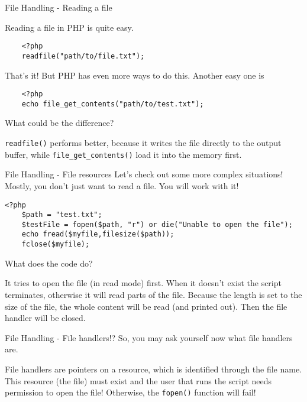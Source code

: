 \begin{frame}[fragile]{File Handling - Reading a file}
	
	Reading a file in PHP is quite easy. \pause
	\begin{lstlisting}
	<?php
	readfile("path/to/file.txt");
	\end{lstlisting} \pause
	That's it! But PHP has even more ways to do this. Another easy one is
	\begin{lstlisting}
	<?php
	echo file_get_contents("path/to/test.txt");
	\end{lstlisting} \pause
	
	What could be the difference?\pause
	
	\texttt{readfile()} performs better, because it writes the file directly to the output buffer, while \texttt{file\_get\_contents()} load it into the memory first.
	
\end{frame}

\begin{frame}[fragile]{File Handling - File resources}
	Let's check out some more complex situations! Mostly, you don't just want to read a file. You will work with it!\pause
	
	\begin{lstlisting}
<?php
    $path = "test.txt";
	$testFile = fopen($path, "r") or die("Unable to open the file");
	echo fread($myfile,filesize($path));
	fclose($myfile);
	\end{lstlisting}\pause
	What does the code do?\pause
	
	It tries to open the file (in read mode) first. When it doesn't exist the script terminates, otherwise it will read parts of the file. Because the length is set to the size of the file, the whole content will be read (and printed out). Then the file handler will be closed. \pause


\end{frame}

\begin{frame}[fragile]{File Handling - File handlers!?}
	So, you may ask yourself now what file handlers are.\pause
	
	File handlers are pointers on a resource, which is identified through the file name. This resource (the file) must exist and the user that runs the script needs permission to open the file! Otherwise, the \texttt{fopen()} function will fail!\pause
	
	
\end{frame}

